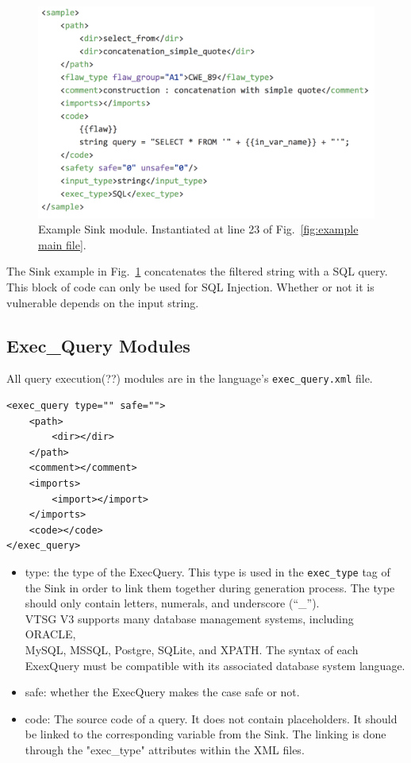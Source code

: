 \documentclass[12pt]{article}
\begin{document}
\begin{figure}[htbp]
  \includegraphics[width=\linewidth]{fig_Sink_file.png}
  \caption{Example Sink module. Instantiated at line 23 of Fig.~\ref{fig:example main file}.}
  \label{fig:example sink file}
\end{figure}

The Sink example in Fig.~\ref{fig:example sink file} 
concatenates the filtered string with a SQL query.  This block 
of code can only be used for SQL Injection.  Whether or not it is
vulnerable depends on the input string.


\subsection{Exec\_Query Modules}

All query execution(??) modules are in the language's \verb|exec_query.xml|
file.

\begin{verbatim}
<exec_query type="" safe="">
    <path>
	    <dir></dir>
    </path>
    <comment></comment>
    <imports>
        <import></import>
    </imports>
    <code></code>
</exec_query>
\end{verbatim}

\begin{itemize}
    \item type: the type of the ExecQuery. This type is used in the 
    \verb|exec_type| tag of the Sink in order to link them together during
    generation process.  The type should only contain letters, numerals, and
    underscore (``\_'').\\
    VTSG V3 supports many database management systems, including ORACLE, \\
    MySQL,
    MSSQL, Postgre, SQLite, and XPATH.  The syntax of each ExexQuery must be
    compatible with its associated database system language.
    
    \item safe: whether the ExecQuery makes the case safe or not.

    \item code: The source code of a query. It does not contain placeholders.
    It should be linked to the corresponding variable from the Sink. The linking is done through the "exec\_type" attributes within the XML files.
\end{itemize}
\end{document}
